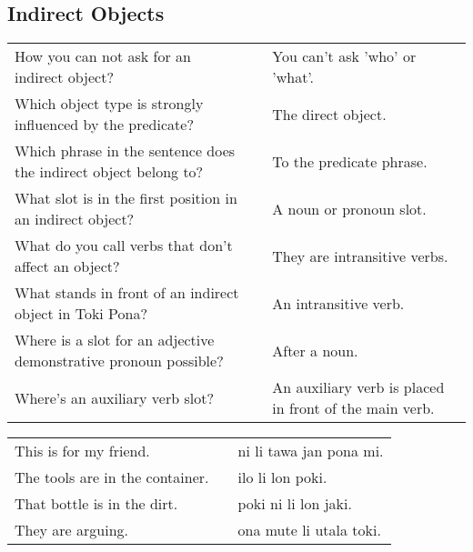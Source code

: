 \subsection*{Indirect Objects} 
\label{'indirect_objects'}
%
\begin{supertabular}{p{5,5cm}|ll}
How you can not ask for an indirect object? && You can't ask 'who' or 'what'. \\ %
Which object type is strongly influenced by the predicate? && The direct object.  \\ %
Which phrase in the sentence does the indirect object belong to? && To the predicate phrase. \\ %
What slot is in the first position in an indirect object? && A noun or pronoun slot. \\ %
What do you call verbs that don't affect an object? && They are intransitive verbs.  \\ %
What stands in front of an indirect object in Toki Pona? && An intransitive verb. \\ %
Where is a slot for an adjective demonstrative pronoun possible? && After a noun. \\ %
Where's an auxiliary verb slot? && An auxiliary verb is placed in front of the main verb. \\ %
\end{supertabular}

\begin{supertabular}{p{5,5cm}|ll}
This is for my friend.  && ni li tawa jan pona mi. \\ %
The tools are in the container.  && ilo li lon poki. \\ %
That bottle is in the dirt.  && poki ni li lon jaki. \\ %
They are arguing. && ona mute li utala toki. \\ %
\end{supertabular} 

